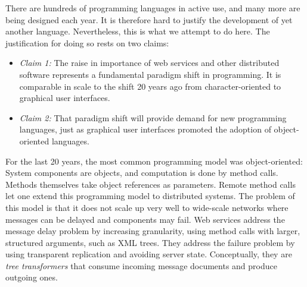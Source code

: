 
There are hundreds of programming languages in active use, and many
more are being designed each year. It is therefore hard to justify the
development of yet another language. Nevertheless, this is what we
attempt to do here. The justification for doing so rests on two claims:
\begin{itemize}
\item[] {\em Claim 1:} The raise in importance of web services and
other distributed software represents a fundamental paradigm
shift in programming. It is comparable in scale to the shift 20 years ago
from character-oriented to graphical user interfaces.
\item[] {\em Claim 2:} That paradigm shift will provide demand
for new programming languages, just as graphical user interfaces
promoted the adoption of object-oriented languages.
\end{itemize}
For the last 20 years, the most common programming model was
object-oriented: System components are objects, and computation is
done by method calls.  Methods themselves take object references as
parameters. Remote method calls let one extend this programming model
to distributed systems. The problem of this model is that it does not
scale up very well to wide-scale networks where messages can be
delayed and components may fail. Web services address the message
delay problem by increasing granularity, using method calls with
larger, structured arguments, such as XML trees.  They address the
failure problem by using transparent replication and avoiding server
state.  Conceptually, they are {\em tree transformers} that consume
incoming message documents and produce outgoing ones.  

